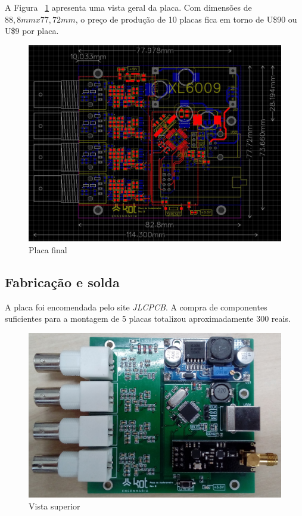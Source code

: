 \documentclass[
	12pt,				%
	openright,			%
	twoside,			%
	a4paper,			%
	english,			%
	french,				%
	spanish,			%
	brazil,				%
	]{abntex2}
\begin{document}
			A Figura ~\ref{fig:placaFinal} apresenta uma vista geral da placa. Com dimensões de
			$88,8mmx77,72mm$, o preço de produção de 10 placas fica em torno de
			U\$90 ou U\$9 por placa.

			\begin{figure}[H]
				\centering
				\includegraphics[width=\linewidth]{../Fotos/placaTotal.jpg}
				\caption{Placa final}
				\label{fig:placaFinal}
			\end{figure}

			\newpage

		\subsection{Fabricação e solda}
			A placa foi encomendada pelo site \textit{JLCPCB}. A compra de componentes suficientes para a montagem de 5 placas totalizou aproximadamente 300 reais.

			\begin{figure}[H]
				\centering
				\includegraphics[width=\linewidth]{../Fotos/vistaSuperior.jpg}
				\caption{Vista superior}
			\end{figure}
		\newpage
\end{document}
